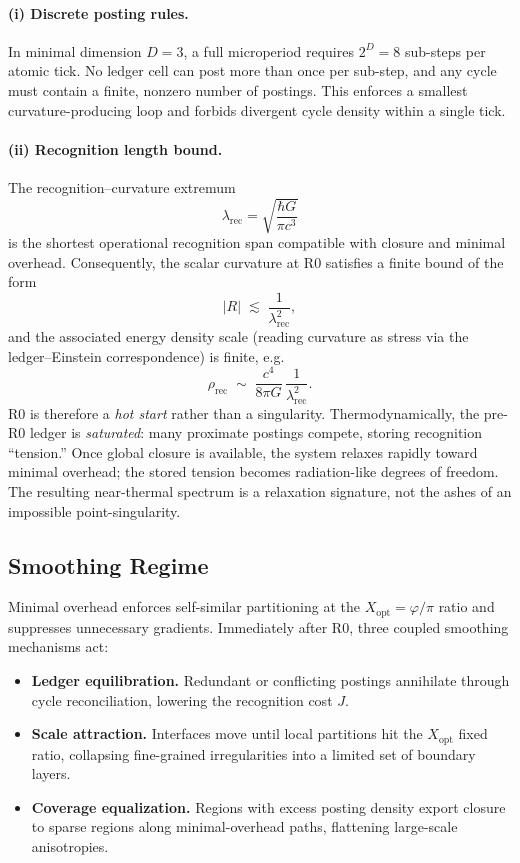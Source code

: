 \documentclass[11pt]{article}
\theoremstyle{definition}
\theoremstyle{remark}
\begin{document}
\paragraph{(i) Discrete posting rules.} In minimal dimension \(D=3\), a full microperiod requires \(2^D=8\) sub-steps per atomic tick. No ledger cell can post more than once per sub-step, and any cycle must contain a finite, nonzero number of postings. This enforces a smallest curvature-producing loop and forbids divergent cycle density within a single tick.

\paragraph{(ii) Recognition length bound.} The recognition–curvature extremum
\[
\lambda_{\mathrm{rec}}=\sqrt{\frac{\hbar G}{\pi c^3}}
\]
is the shortest operational recognition span compatible with closure and minimal overhead. Consequently, the scalar curvature at R0 satisfies a finite bound of the form
\[
|R| \;\lesssim\; \frac{1}{\lambda_{\mathrm{rec}}^{2}},
\]
and the associated energy density scale (reading curvature as stress via the ledger–Einstein correspondence) is finite, e.g.
\[
\rho_{\mathrm{rec}}\;\sim\;\frac{c^4}{8\pi G}\,\frac{1}{\lambda_{\mathrm{rec}}^{2}}.
\]
R0 is therefore a \emph{hot start} rather than a singularity. Thermodynamically, the pre-R0 ledger is \emph{saturated}: many proximate postings compete, storing recognition “tension.” Once global closure is available, the system relaxes rapidly toward minimal overhead; the stored tension becomes radiation-like degrees of freedom. The resulting near-thermal spectrum is a relaxation signature, not the ashes of an impossible point-singularity.

\subsection{Smoothing Regime}
Minimal overhead enforces self-similar partitioning at the \(X_{\mathrm{opt}}=\varphi/\pi\) ratio and suppresses unnecessary gradients. Immediately after R0, three coupled smoothing mechanisms act:

\begin{itemize}
\item \textbf{Ledger equilibration.} Redundant or conflicting postings annihilate through cycle reconciliation, lowering the recognition cost \(J\).
\item \textbf{Scale attraction.} Interfaces move until local partitions hit the \(X_{\mathrm{opt}}\) fixed ratio, collapsing fine-grained irregularities into a limited set of boundary layers.
\item \textbf{Coverage equalization.} Regions with excess posting density export closure to sparse regions along minimal-overhead paths, flattening large-scale anisotropies.
\end{itemize}
\end{document}
